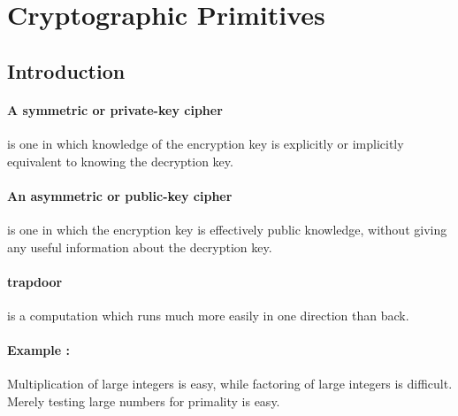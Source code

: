 \documentclass[12pt]{article}
\begin{document}
\section{Cryptographic Primitives}
\subsection{Introduction}
\paragraph{A symmetric or private-key cipher} is one in which knowledge of the encryption key is explicitly or implicitly equivalent to knowing the decryption key.
\paragraph{An asymmetric or public-key cipher} is one in which the encryption key is effectively public knowledge, without giving any useful information about the decryption key.

\paragraph{trapdoor } is a computation which runs much more easily in one direction than back.

\paragraph{Example : }Multiplication of large integers is easy, while factoring of large integers is difficult.\\
Merely testing large numbers for primality is easy.
\end{document}
